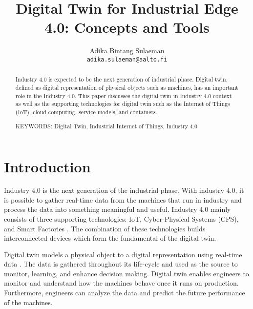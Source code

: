 \documentclass[article]{aaltoseries}
\begin{document}
 

\title{Digital Twin for Industrial Edge 4.0: Concepts and Tools}

\author{Adika Bintang Sulaeman%
\\\textnormal{\texttt{adika.sulaeman@aalto.fi}}} %


\maketitle


\begin{abstract}
  Industry 4.0 is expected to be the next generation of industrial phase. Digital twin, defined as digital representation of physical objects such as machines, has an important role in the Industry 4.0. This paper discusses the digital twin in Industry 4.0 context as well as the supporting technologies for digital twin such as the Internet of Things (IoT), cloud computing, service models, and containers.
  
\vspace{3mm}
\noindent KEYWORDS: Digital Twin, Industrial Internet of Things, Industry 4.0

\end{abstract}




\section{Introduction}

Industry 4.0 is the next generation of the industrial phase. With industry 4.0, it is possible to gather real-time data from the machines that run in industry and process the data into something meaningful and useful. Industry 4.0 mainly consists of three supporting technologies: IoT, Cyber-Physical Systems (CPS), and Smart Factories \cite{hermann2016design}. The combination of these technologies builds interconnected devices which form the fundamental of the digital twin.

Digital twin models a physical object to a digital representation using real-time data \cite{Cheatshe3:online}. The data is gathered throughout its life-cycle and used as the source to monitor, learning, and enhance decision making. Digital twin enables engineers to monitor and understand how the machines behave once it runs on production. Furthermore, engineers can analyze the data and predict the future performance of the machines.
\end{document}
